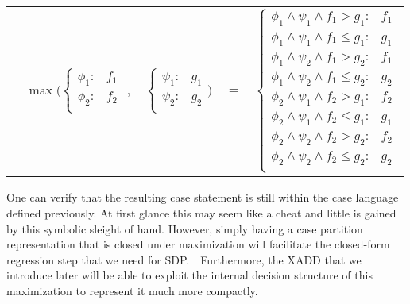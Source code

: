 {\footnotesize
\begin{center}
\begin{tabular}{r c c c l}
&
\hspace{-9mm} $\max \Bigg(
  \begin{cases}
    \phi_1: & f_1 \\ 
    \phi_2: & f_2 \\ 
  \end{cases}$
$,$
&
\hspace{-4mm}
  $\begin{cases}
    \psi_1: & g_1 \\ 
    \psi_2: & g_2 \\ 
  \end{cases} \Bigg)$
&
\hspace{-4mm} 
$ = $
&
\hspace{-4mm}
  $\begin{cases}
  \phi_1 \wedge \psi_1 \wedge f_1 > g_1    : & f_1 \\ 
  \phi_1 \wedge \psi_1 \wedge f_1 \leq g_1 : & g_1 \\ 
  \phi_1 \wedge \psi_2 \wedge f_1 > g_2    : & f_1 \\ 
  \phi_1 \wedge \psi_2 \wedge f_1 \leq g_2 : & g_2 \\ 
  \phi_2 \wedge \psi_1 \wedge f_2 > g_1    : & f_2 \\ 
  \phi_2 \wedge \psi_1 \wedge f_2 \leq g_1 : & g_1 \\ 
  \phi_2 \wedge \psi_2 \wedge f_2 > g_2    : & f_2 \\ 
  \phi_2 \wedge \psi_2 \wedge f_2 \leq g_2 : & g_2 \\ 
  \end{cases}$
\end{tabular}
\end{center}
}
One can verify that the resulting case statement is still
within the case language defined previously.  At first
glance this may seem like a cheat and little is gained
by this symbolic sleight of hand.  However, simply
having a case partition representation that is closed under 
maximization will facilitate the closed-form regression 
step that we need for SDP.\ \  Furthermore, the 
XADD that we introduce later will be able to exploit the 
internal decision structure of this
maximization to represent it much more compactly.

